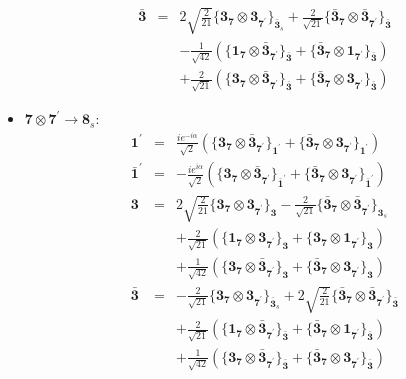\documentclass[english]{article}
\newcommand{\subcg}[3]{\big\{ {#1}\otimes{#2}\big\}^{}_{#3}}
\newcommand{\rep}[1]{\mathbf{#1}}
\begin{document}
\begin{itemize}
\begin{eqnarray*}
\rep{\bar{3}} &=& 2 \sqrt{\frac{2}{21}}\subcg{\rep{3}_{\rep{7}}}{\rep{3}_{\rep{7^{\prime}}}}{\rep{\bar{3}}_{s}}+\frac{2}{\sqrt{21}}\subcg{\rep{\bar{3}}_{\rep{7}}}{\rep{\bar{3}}_{\rep{7^{\prime}}}}{\rep{\bar{3}}} \\ 
 & & -\frac{1}{\sqrt{42}}\left(\subcg{\rep{1}_{\rep{7}}}{\rep{\bar{3}}_{\rep{7^{\prime}}}}{\rep{\bar{3}}}+\subcg{\rep{\bar{3}}_{\rep{7}}}{\rep{1}_{\rep{7^{\prime}}}}{\rep{\bar{3}}}\right) \\ 
 & & +\frac{2}{\sqrt{21}}\left(\subcg{\rep{3}_{\rep{7}}}{\rep{\bar{3}}_{\rep{7^{\prime}}}}{\rep{\bar{3}}}+\subcg{\rep{\bar{3}}_{\rep{7}}}{\rep{3}_{\rep{7^{\prime}}}}{\rep{\bar{3}}}\right)
\end{eqnarray*}
\item $\rep{7}\otimes\rep{7^{\prime}}\to\rep{8}_{s}$:
\begin{eqnarray*}
\rep{1^{\prime}} &=& \frac{i e^{-i \alpha }}{\sqrt{2}}\left(\subcg{\rep{3}_{\rep{7}}}{\rep{\bar{3}}_{\rep{7^{\prime}}}}{\rep{1^{\prime}}}+\subcg{\rep{\bar{3}}_{\rep{7}}}{\rep{3}_{\rep{7^{\prime}}}}{\rep{1^{\prime}}}\right)
\\
\rep{\bar{1}^{\prime}} &=& -\frac{i e^{i \alpha }}{\sqrt{2}}\left(\subcg{\rep{3}_{\rep{7}}}{\rep{\bar{3}}_{\rep{7^{\prime}}}}{\rep{\bar{1}^{\prime}}}+\subcg{\rep{\bar{3}}_{\rep{7}}}{\rep{3}_{\rep{7^{\prime}}}}{\rep{\bar{1}^{\prime}}}\right)
\\
\rep{3} &=& 2 \sqrt{\frac{2}{21}}\subcg{\rep{3}_{\rep{7}}}{\rep{3}_{\rep{7^{\prime}}}}{\rep{3}}-\frac{2}{\sqrt{21}}\subcg{\rep{\bar{3}}_{\rep{7}}}{\rep{\bar{3}}_{\rep{7^{\prime}}}}{\rep{3}_{s}} \\ 
 & & +\frac{2}{\sqrt{21}}\left(\subcg{\rep{1}_{\rep{7}}}{\rep{3}_{\rep{7^{\prime}}}}{\rep{3}}+\subcg{\rep{3}_{\rep{7}}}{\rep{1}_{\rep{7^{\prime}}}}{\rep{3}}\right) \\ 
 & & +\frac{1}{\sqrt{42}}\left(\subcg{\rep{3}_{\rep{7}}}{\rep{\bar{3}}_{\rep{7^{\prime}}}}{\rep{3}}+\subcg{\rep{\bar{3}}_{\rep{7}}}{\rep{3}_{\rep{7^{\prime}}}}{\rep{3}}\right)
\\
\rep{\bar{3}} &=& -\frac{2}{\sqrt{21}}\subcg{\rep{3}_{\rep{7}}}{\rep{3}_{\rep{7^{\prime}}}}{\rep{\bar{3}}_{s}}+2 \sqrt{\frac{2}{21}}\subcg{\rep{\bar{3}}_{\rep{7}}}{\rep{\bar{3}}_{\rep{7^{\prime}}}}{\rep{\bar{3}}} \\ 
 & & +\frac{2}{\sqrt{21}}\left(\subcg{\rep{1}_{\rep{7}}}{\rep{\bar{3}}_{\rep{7^{\prime}}}}{\rep{\bar{3}}}+\subcg{\rep{\bar{3}}_{\rep{7}}}{\rep{1}_{\rep{7^{\prime}}}}{\rep{\bar{3}}}\right) \\ 
 & & +\frac{1}{\sqrt{42}}\left(\subcg{\rep{3}_{\rep{7}}}{\rep{\bar{3}}_{\rep{7^{\prime}}}}{\rep{\bar{3}}}+\subcg{\rep{\bar{3}}_{\rep{7}}}{\rep{3}_{\rep{7^{\prime}}}}{\rep{\bar{3}}}\right)

\end{eqnarray*}
\end{itemize}
\end{document}
